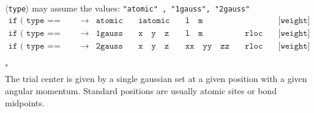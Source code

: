 \noindent $\langle${\tt type}$\rangle$ may assume the values: {\tt "atomic" , "1gauss", "2gauss" }\\
%
%
\begin{displaymath}
\begin{array}{lllllll}
\texttt{if ( type == "atomic" )}  & \rightarrow
& \texttt{atomic}
&\quad \texttt{iatomic}
&\quad \texttt{l} \quad  \texttt{m}
&\quad \texttt{ }
&\quad \texttt{[weight]}\\
\texttt{if ( type == "1gauss" )}  & \rightarrow
& \texttt{1gauss}
&\quad \texttt{x} \quad  \texttt{y} \quad  \texttt{z}
&\quad \texttt{l} \quad  \texttt{m}
&\quad \texttt{rloc}
&\quad \texttt{[weight]} \\
\texttt{if ( type == "2gauss" )}  & \rightarrow
& \texttt{2gauss}
&\quad \texttt{x} \quad  \texttt{y} \quad  \texttt{z}
&\quad \texttt{xx} \quad  \texttt{yy} \quad  \texttt{zz}
&\quad \texttt{rloc}
&\quad \texttt{[weight]}
\end{array}
\end{displaymath}
%
%
\bigskip

"\\
\noindent The trial center is given by a single gaussian set at a given position with a given
angular momentum. Standard positions are usually atomic sites or bond midpoints.\\

